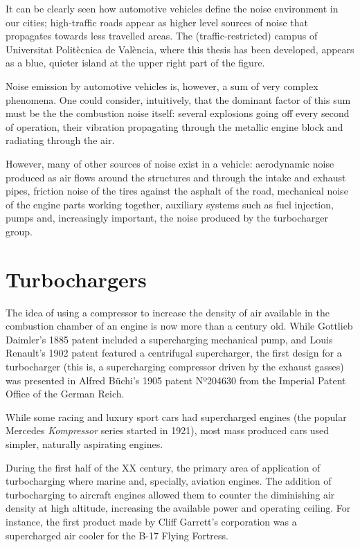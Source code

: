 It can be clearly seen how automotive vehicles define the noise environment in our cities; high-traffic roads appear as higher level sources of noise that propagates towards less travelled areas. The (traffic-restricted) campus of Universitat Politècnica de València, where this thesis has been developed, appears as a blue, quieter island at the upper right part of the figure.

Noise emission by automotive vehicles is, however, a sum of very complex phenomena. One could consider, intuitively, that the dominant factor of this sum must be the the combustion noise itself: several explosions going off every second of operation, their vibration propagating through the metallic engine block and radiating through the air.

However, many of other sources of noise exist in a vehicle: aerodynamic noise produced as air flows around the structures and through the intake and exhaust pipes, friction noise of the tires against the asphalt of the road, mechanical noise of the engine parts working together, auxiliary systems such as fuel injection, pumps and, increasingly important, the noise produced by the turbocharger group.

\section{Turbochargers}

The idea of using a compressor to increase the density of air available in the combustion chamber of an engine is now more than a century old. While Gottlieb Daimler's 1885 patent included a supercharging mechanical pump, and Louis Renault's 1902 patent featured a centrifugal supercharger, the first design for a turbocharger (this is, a supercharging compressor driven by the exhaust gasses) was presented in Alfred Büchi's 1905 patent Nº204630 from the Imperial Patent Office of the German Reich.

While some racing and luxury sport cars had supercharged engines (the popular Mercedes \emph{Kompressor} series started in 1921), most mass produced cars used simpler, naturally aspirating engines.

During the first half of the XX century, the primary area of application of turbocharging where marine and, specially, aviation engines. The addition of turbocharging to aircraft engines allowed them to counter the diminishing air density at high altitude, increasing the available power and operating ceiling. For instance, the first product made by Cliff Garrett's corporation was a supercharged air cooler for the B-17 Flying Fortress.

